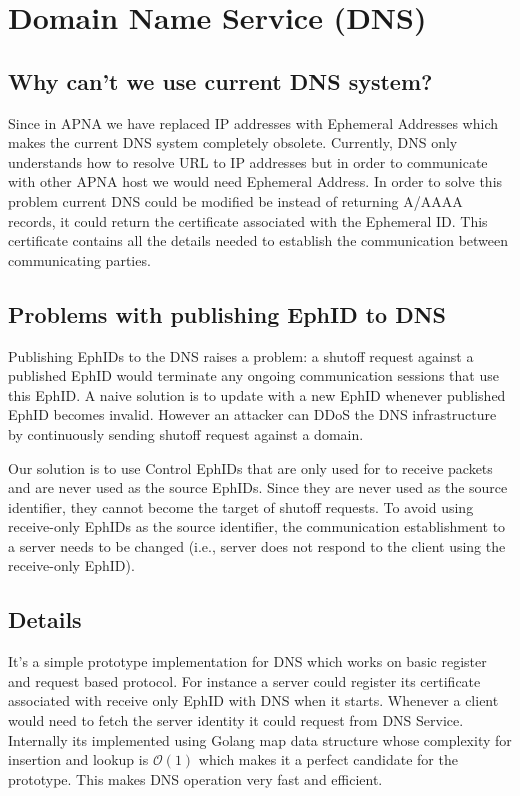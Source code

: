\section{Domain Name Service (DNS)} \label{sec:apna_dns}
\subsection{Why can't we use current DNS system?}
Since in APNA we have replaced IP addresses with Ephemeral Addresses which makes the current DNS system completely obsolete. Currently, DNS only understands how to resolve URL to IP addresses but in order to communicate with other APNA host we would need Ephemeral Address. In order to solve this problem current DNS could be modified be instead of returning A/AAAA records, it could return the certificate associated with the Ephemeral ID. This certificate contains all the details needed to establish the communication between communicating parties.

\subsection{Problems with publishing EphID to DNS}
Publishing EphIDs to the DNS raises a problem: a shutoff request against a published EphID would terminate any ongoing communication sessions that use this EphID. A naive solution is to update with a new EphID whenever published EphID becomes invalid. However an attacker can DDoS the DNS infrastructure by continuously sending shutoff request against a domain.

Our solution is to use Control EphIDs that are only used for to receive packets and are never used as the source EphIDs. Since they are never used as the source identifier, they cannot become the target of shutoff requests. To avoid using receive-only EphIDs as the source identifier, the communication establishment to a server needs to be changed (i.e., server does not respond to the client using the receive-only EphID).

\subsection{Details}
It's a simple prototype implementation for DNS which works on basic register and request based protocol. For instance a server could register its certificate associated with receive only EphID with DNS when it starts. Whenever a client would need to fetch the server identity it could request from DNS Service. Internally its implemented using Golang map data structure whose complexity for insertion and lookup is $\mathcal{O}(1)$ which makes it a perfect candidate for the prototype. This makes DNS operation very fast and efficient.

